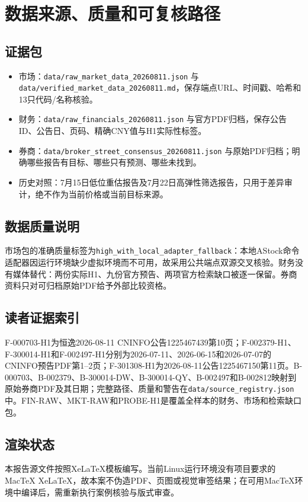 \chapter{数据来源、质量和可复核路径}

\section{证据包}

\begin{itemize}
  \item 市场：\texttt{data/raw\_market\_data\_20260811.json} 与 \texttt{data/verified\_market\_data\_20260811.md}，保存端点URL、时间戳、哈希和13只代码/名称核验。
  \item 财务：\texttt{data/raw\_financials\_20260811.json} 与官方PDF归档，保存公告ID、公告日、页码、精确CNY值与H1实际性标签。
  \item 券商：\texttt{data/broker\_street\_consensus\_20260811.json} 与原始PDF归档；明确哪些报告有目标、哪些只有预测、哪些未找到。
  \item 历史对照：7月15日低位重估报告及7月22日高弹性筛选报告，只用于差异审计，绝不作为当前价格或当前目标来源。
\end{itemize}

\section{数据质量说明}

市场包的准确质量标签为\texttt{high\_with\_local\_adapter\_fallback}：本地AStock命令适配器因运行环境缺少虚拟环境而不可用，故采用公共端点双源交叉核验。财务没有媒体替代：两份实际H1、九份官方预告、两项官方检索缺口被逐一保留。券商资料只对可归档原始PDF给予外部比较资格。

\section{读者证据索引}

F-000703-H1为恒逸2026-08-11 CNINFO公告1225467439第10页；F-002379-H1、F-300014-H1和F-002497-H1分别为2026-07-11、2026-06-15和2026-07-07的CNINFO预告PDF第1--2页；F-301308-H1为2026-08-11公告1225467150第11页。B-000703、B-002379、B-300014-DW、B-300014-QY、B-002497和B-002812映射到原始券商PDF及其日期；完整路径、质量和警告在\texttt{data/source\_registry.json}中。FIN-RAW、MKT-RAW和PROBE-H1是覆盖全样本的财务、市场和检索缺口包。

\section{渲染状态}

本报告源文件按照XeLaTeX模板编写。当前Linux运行环境没有项目要求的MacTeX XeLaTeX，故本案不伪造PDF、页图或视觉审签结果；在可用MacTeX环境中编译后，需重新执行案例核验与版式审查。

